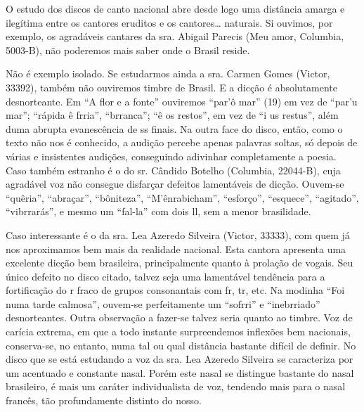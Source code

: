 O estudo dos discos de canto nacional abre desde logo uma distância
amarga e ilegítima entre os cantores eruditos e os cantores\ldots{} naturais.
Si ouvimos, por exemplo, os agradáveis cantares da sra. Abigail Parecis
(Meu amor, Columbia, 5003-B), não poderemos mais saber onde o Brasil
reside.

Não é exemplo isolado. Se estudarmos ainda a sra. Carmen Gomes (Victor,
33392), também não ouviremos timbre de Brasil. E a dicção é
absolutamente desnorteante. Em ``A flor e a fonte'' ouviremos ``par'ô
mar'' (19) em vez de ``par'u mar''; ``rápida ê frria'', ``brranca''; ``ê
os restos'', em vez de ``i us restus'', além duma abrupta evanescência
de ss finais. Na outra face do disco, então, como o texto não nos é
conhecido, a audição percebe apenas palavras soltas, só depois de várias
e insistentes audições, conseguindo adivinhar completamente a poesia.
Caso também estranho é o do sr. Cândido Botelho (Columbia, 22044-B),
cuja agradável voz não consegue disfarçar defeitos lamentáveis de
dicção. Ouvem-se ``quêria'', ``abraçar'', ``bôniteza'',
``M'ênrabicham'', ``esforço'', ``esquece'', ``agitado'', ``vibrrarás'',
e mesmo um ``fal-la'' com dois ll, sem a menor brasilidade.

Caso interessante é o da sra. Lea Azeredo Silveira (Victor, 33333), com
quem já nos aproximamos bem mais da realidade nacional. Esta cantora
apresenta uma excelente dicção bem brasileira, principalmente quanto à
prolação de vogais. Seu único defeito no disco citado, talvez seja uma
lamentável tendência para a fortificação do r fraco de grupos
consonantais com fr, tr, etc. Na modinha ``Foi numa tarde calmosa'',
ouvem-se perfeitamente um ``sofrri'' e ``inebrriado'' desnorteantes.
Outra observação a fazer-se talvez seria quanto ao timbre. Voz de
carícia extrema, em que a todo instante surpreendemos inflexões bem
nacionais, conserva-se, no entanto, numa tal ou qual distância bastante
difícil de definir. No disco que se está estudando a voz da sra. Lea
Azeredo Silveira se caracteriza por um acentuado e constante nasal.
Porém este nasal se distingue bastante do nasal brasileiro, é mais um
caráter individualista de voz, tendendo mais para o nasal francês, tão
profundamente distinto do nosso.


